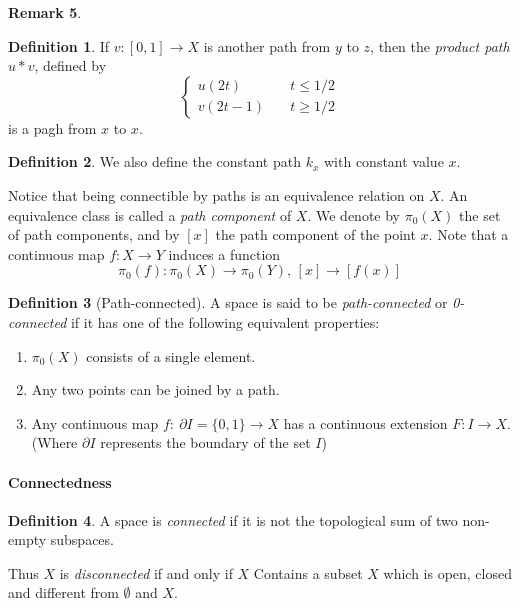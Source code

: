 \documentclass[11pt,a4paper]{article}
\theoremstyle{definition}
\newtheorem{definition}{Definition}[section]
\newtheorem{remark}[definition]{Remark}
\theoremstyle{plain}
\theoremstyle{remark}
\begin{document}
\begin{remark}
\begin{definition}
  If $v \colon [0,1] \to X$ is another path from $y$ to $z$, then the \emph{product path} $u * v$, defined by 
  $$\begin{cases}
    u(2t) \quad &t \leq 1/2 \\
    v(2t - 1) \quad &t \geq 1/2
  \end{cases}$$
  is a pagh from $x$ to $x$. 
\end{definition}

\begin{definition}
  We also define the constant path $k_x$ with constant value $x$.
\end{definition}

Notice that being connectible by paths is an equivalence relation on $X$. An equivalence class is 
called a \emph{path component} of $X$. We denote by $\pi_0(X)$ the set of path components, and by $[x]$ the 
path component of the point $x$. Note that a continuous map $f \colon X \to Y$ induces a function 
$$\pi_0(f) \colon \pi_0(X) \to \pi_0(Y), \, [x] \to [f(x)]$$

\begin{definition}[Path-connected]
  A space is said to be \emph{path-connected} or \emph{0-connected} if it has one of the following equivalent properties: 
  \begin{enumerate}
    \item $\pi_0(X)$ consists of a single element. 
    \item Any two points can be joined by a path. 
    \item Any continuous map $f \colon \: \partial I = \{0,1\} \to X$ has a continuous extension 
    $F \colon I \to X$. \\
    (Where $\partial I$ represents the boundary of the set $I$)
  \end{enumerate}
\end{definition}

\paragraph{Connectedness}
\begin{definition}
  A space is \emph{connected} if it is not the topological sum of two non-empty subspaces.

  Thus $X$ is \emph{disconnected} if and only if $X$ Contains a subset $X$ which is open, closed and different 
  from $\emptyset$ and $X$. 
\end{definition}


\end{remark}
\end{document}
